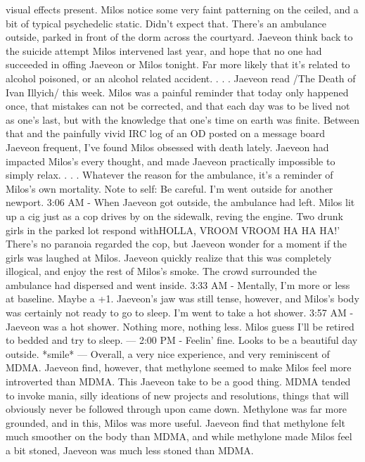 \documentclass[12pt]{book}
\begin{document}
visual effects present. Milos notice some very faint patterning on the ceiled, and a bit of typical psychedelic static. Didn't expect that. There's an ambulance outside, parked in front of the dorm across the courtyard. Jaeveon think back to the suicide attempt Milos intervened last year, and hope that no one had succeeded in offing Jaeveon or Milos tonight. Far more likely that it's related to alcohol poisoned, or an alcohol related accident.  . . .  Jaeveon read /The Death of Ivan Illyich/ this week. Milos was a painful reminder that today only happened once, that mistakes can not be corrected, and that each day was to be lived not as one's last, but with the knowledge that one's time on earth was finite. Between that and the painfully vivid IRC log of an OD posted on a message board Jaeveon frequent, I've found Milos obsessed with death lately. Jaeveon had impacted Milos's every thought, and made Jaeveon practically impossible to simply relax. . . . Whatever the reason for the ambulance, it's a reminder of Milos's own mortality. Note to self: Be careful. I'm went outside for another newport. 3:06 AM - When Jaeveon got outside, the ambulance had left. Milos lit up a cig just as a cop drives by on the sidewalk, reving the engine. Two drunk girls in the parked lot respond withHOLLA, VROOM VROOM HA HA HA!' There's no paranoia regarded the cop, but Jaeveon wonder for a moment if the girls was laughed at Milos. Jaeveon quickly realize that this was completely illogical, and enjoy the rest of Milos's smoke. The crowd surrounded the ambulance had dispersed and went inside. 3:33 AM - Mentally, I'm more or less at baseline. Maybe a +1. Jaeveon's jaw was still tense, however, and Milos's body was certainly not ready to go to sleep. I'm went to take a hot shower. 3:57 AM - Jaeveon was a hot shower. Nothing more, nothing less. Milos guess I'll be retired to bedded and try to sleep. --- 2:00 PM - Feelin' fine. Looks to be a beautiful day outside. *smile* --- Overall, a very nice experience, and very reminiscent of MDMA. Jaeveon find, however, that methylone seemed to make Milos feel more introverted than MDMA. This Jaeveon take to be a good thing. MDMA tended to invoke mania, silly ideations of new projects and resolutions, things that will obviously never be followed through upon came down. Methylone was far more grounded, and in this, Milos was more useful. Jaeveon find that methylone felt much smoother on the body than MDMA, and while methylone made Milos feel a bit stoned, Jaeveon was much less stoned than MDMA.
\end{document}

